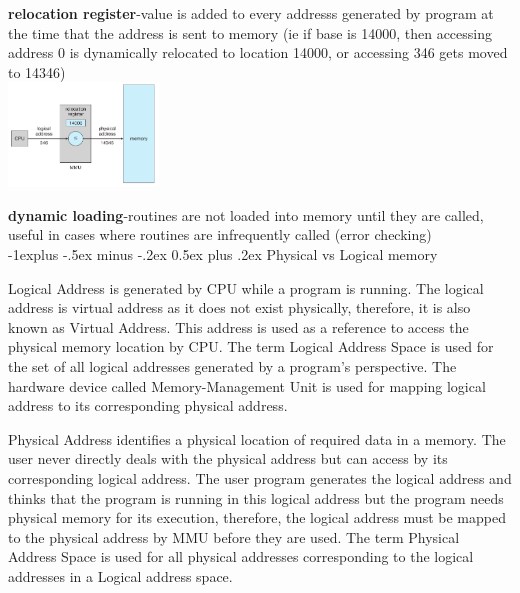 \documentclass[8pt,landscape]{article}
\makeatletter
\renewcommand{\subsection}{\@startsection{subsection}{2}{0mm}%
                                {-1explus -.5ex minus -.2ex}%
                                {0.5ex plus .2ex}%
                                {\normalfont\scriptsize\bfseries}}
\makeatother
\begin{document}
\begin{multicols}{3}
\begin{tiny}
	\textbf{relocation register}-value is added to every addresss generated by program at the
	time that the address is sent to memory (ie if base is 14000, then accessing address 0 is 
	dynamically relocated to location 14000, or accessing 346 gets moved to 14346)\\
	\begingroup
		\centering
		\includegraphics[width=4cm]{relocate.png}
	\endgroup
	
	\textbf{dynamic loading}-routines are not loaded into memory until they are called, useful
	in cases where routines are infrequently called (error checking)\\
	
	\subsection{Physical vs Logical memory}

	Logical Address is generated by CPU while a program is running. The logical address is virtual address as it does not exist physically, therefore, it is also known as Virtual Address. This address is used as a reference to access the physical memory location by CPU. The term Logical Address Space is used for the set of all logical addresses generated by a program’s perspective.
The hardware device called Memory-Management Unit is used for mapping logical address to its corresponding physical address.

Physical Address identifies a physical location of required data in a memory. The user never directly deals with the physical address but can access by its corresponding logical address. The user program generates the logical address and thinks that the program is running in this logical address but the program needs physical memory for its execution, therefore, the logical address must be mapped to the physical address by MMU before they are used. The term Physical Address Space is used for all physical addresses corresponding to the logical addresses in a Logical address space.


\end{tiny}
\end{multicols}
\end{document}
